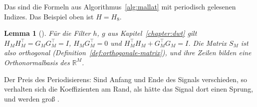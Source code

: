 \documentclass[a4paper,11pt,bibliography=totoc,listof=totoc,headinclude=true,cleardoublepage=empty,oneside]{scrbook}
\theoremstyle{plain}
\newtheorem{Lemma}[Satz]{Lemma}
\theoremstyle{definition}
\newcommand{\R}{\mathbb{R}}
\begin{document}
Das sind die Formeln aus Algorithmus~\ref{alg:mallat} mit periodisch gelesenen
Indizes. Das Beispiel oben ist $H = H_8$.
 
\begin{Lemma}[{\cite[Kap.~3.6.2, Gl.~(3.6.18)--(3.6.20)]{lmr}}] %
\label{lem:dwt-orthogonal}
Für die Filter $h$, $g$ aus Kapitel~\ref{chapter:dwt} gilt
$H_MH_M^\top = G_MG_M^\top = I$, $H_MG_M^\top = 0$ und
$H_M^\top H_M + G_M^\top G_M = I$. Die Matrix $S_M$ ist also orthogonal
(Definition~\ref{def:orthogonale-matrix}), und ihre Zeilen bilden eine
Orthonormalbasis des $\R^M$.
\end{Lemma}
 
Der Preis des Periodisierens: Sind Anfang und Ende des Signals verschieden, so
verhalten sich die Koeffizienten am Rand, als hätte das Signal dort einen
Sprung, und werden gro\ss{} \cite[Kap.~7.5.1]{mallat}. %
 
\end{document}
